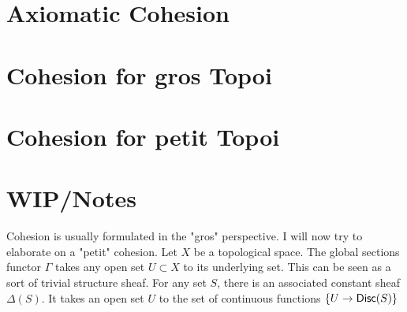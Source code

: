 \section{Axiomatic Cohesion}
\section{Cohesion for gros Topoi}
\section{Cohesion for petit Topoi}
\section{WIP/Notes}
Cohesion is usually formulated in the "gros" perspective. I will now try to elaborate on a "petit" cohesion.
Let $X$ be a topological space. The global sections functor $\Gamma$ takes any open set $U \subset X$ to its underlying set. This can be seen as a sort of trivial structure sheaf. For any set $S$, there is an associated constant sheaf $\Delta(S)$. It takes an open set $U$ to the set of continuous functions $\{U \to \mathsf{Disc}(S)\}$